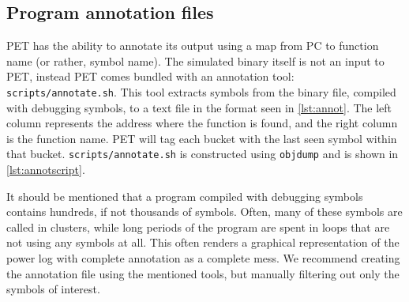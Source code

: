 \subsection{Program annotation files}
\label{subsec:annot}

PET has the ability to annotate its output using a map from PC to function name
(or rather, symbol name). The simulated binary itself is not an input to PET,
instead PET comes bundled with an annotation tool: \texttt{scripts/annotate.sh}.
This tool extracts symbols from the binary file, compiled with debugging
symbols, to a text file in the format seen in \autoref{lst:annot}. The left
column represents the address where the function is found, and the right
column is the function name. PET will tag each bucket with the last seen
symbol within that bucket. \texttt{scripts/annotate.sh} is constructed using
\texttt{objdump} and is shown in \autoref{lst:annotscript}.




It should be mentioned that a program compiled with debugging symbols contains
hundreds, if not thousands of symbols. Often, many of these symbols are called
in clusters, while long periods of the program are spent in loops that are not
using any symbols at all. This often renders a graphical representation of the
power log with complete annotation as a complete mess. We recommend creating the
annotation file using the mentioned tools, but manually filtering out only the
symbols of interest.

